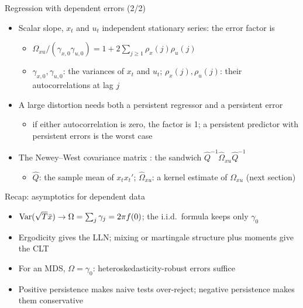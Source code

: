 \begin{frame}{Regression with dependent errors (2/2)}
\itemsize{\small}
\begin{itemize}
    \item Scalar slope, $x_t$ and $u_t$ independent stationary series: the error factor is
    \begin{itemize}
        \item $\Omega_{xu}/(\gamma_{x,0}\gamma_{u,0}) = 1 + 2\sum_{j\ge 1}\rho_{x}(j)\rho_{u}(j)$
        \item $\gamma_{x,0}, \gamma_{u,0}$: the variances of $x_t$ and $u_t$; $\rho_x(j), \rho_u(j)$: their autocorrelations at lag $j$
    \end{itemize}
    \item A large distortion needs both a persistent regressor and a persistent error
    \begin{itemize}
        \item if either autocorrelation is zero, the factor is 1; a persistent predictor with persistent errors is the worst case
    \end{itemize}
    \item The Newey--West covariance matrix : the sandwich $\hat Q^{-1}\hat\Omega_{xu}\hat Q^{-1}$
    \begin{itemize}
        \item $\hat Q$: the sample mean of $x_tx_t'$; $\hat\Omega_{xu}$: a kernel estimate of $\Omega_{xu}$ (next section)
    \end{itemize}
\end{itemize}
\end{frame}

\begin{frame}{Recap: asymptotics for dependent data}
\itemsize{\small}
\begin{itemize}
    \item $\text{Var}(\sqrt{T}\bar x) \to \Omega = \sum_j\gamma_j = 2\pi f(0)$; the i.i.d.\ formula keeps only $\gamma_0$
    \item Ergodicity gives the LLN; mixing or martingale structure plus moments give the CLT
    \item For an MDS, $\Omega = \gamma_0$: heteroskedasticity-robust errors suffice
    \item Positive persistence makes naive tests over-reject; negative persistence makes them conservative
\end{itemize}
\end{frame}


